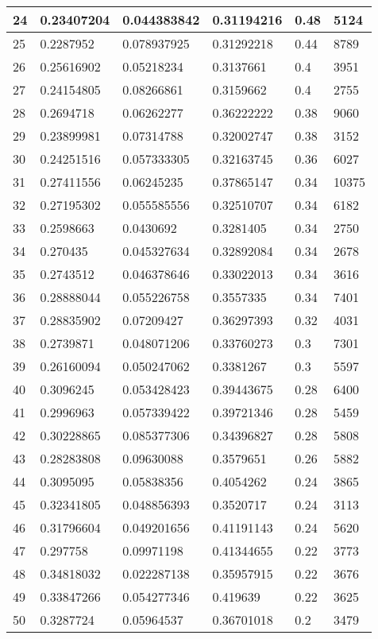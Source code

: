 \begin{longtable}{|l|l|l|l|l|l|}
24 & 0.23407204 & 0.044383842 & 0.31194216 & 0.48 & 5124 \\ \hline 
25 & 0.2287952 & 0.078937925 & 0.31292218 & 0.44 & 8789 \\ \hline 
26 & 0.25616902 & 0.05218234 & 0.3137661 & 0.4 & 3951 \\ \hline 
27 & 0.24154805 & 0.08266861 & 0.3159662 & 0.4 & 2755 \\ \hline 
28 & 0.2694718 & 0.06262277 & 0.36222222 & 0.38 & 9060 \\ \hline 
29 & 0.23899981 & 0.07314788 & 0.32002747 & 0.38 & 3152 \\ \hline 
30 & 0.24251516 & 0.057333305 & 0.32163745 & 0.36 & 6027 \\ \hline 
31 & 0.27411556 & 0.06245235 & 0.37865147 & 0.34 & 10375 \\ \hline 
32 & 0.27195302 & 0.055585556 & 0.32510707 & 0.34 & 6182 \\ \hline 
33 & 0.2598663 & 0.0430692 & 0.3281405 & 0.34 & 2750 \\ \hline 
34 & 0.270435 & 0.045327634 & 0.32892084 & 0.34 & 2678 \\ \hline 
35 & 0.2743512 & 0.046378646 & 0.33022013 & 0.34 & 3616 \\ \hline 
36 & 0.28888044 & 0.055226758 & 0.3557335 & 0.34 & 7401 \\ \hline 
37 & 0.28835902 & 0.07209427 & 0.36297393 & 0.32 & 4031 \\ \hline 
38 & 0.2739871 & 0.048071206 & 0.33760273 & 0.3 & 7301 \\ \hline 
39 & 0.26160094 & 0.050247062 & 0.3381267 & 0.3 & 5597 \\ \hline 
40 & 0.3096245 & 0.053428423 & 0.39443675 & 0.28 & 6400 \\ \hline 
41 & 0.2996963 & 0.057339422 & 0.39721346 & 0.28 & 5459 \\ \hline 
42 & 0.30228865 & 0.085377306 & 0.34396827 & 0.28 & 5808 \\ \hline 
43 & 0.28283808 & 0.09630088 & 0.3579651 & 0.26 & 5882 \\ \hline 
44 & 0.3095095 & 0.05838356 & 0.4054262 & 0.24 & 3865 \\ \hline 
45 & 0.32341805 & 0.048856393 & 0.3520717 & 0.24 & 3113 \\ \hline 
46 & 0.31796604 & 0.049201656 & 0.41191143 & 0.24 & 5620 \\ \hline 
47 & 0.297758 & 0.09971198 & 0.41344655 & 0.22 & 3773 \\ \hline 
48 & 0.34818032 & 0.022287138 & 0.35957915 & 0.22 & 3676 \\ \hline 
49 & 0.33847266 & 0.054277346 & 0.419639 & 0.22 & 3625 \\ \hline 
50 & 0.3287724 & 0.05964537 & 0.36701018 & 0.2 & 3479 \\ \hline 
\end{longtable}